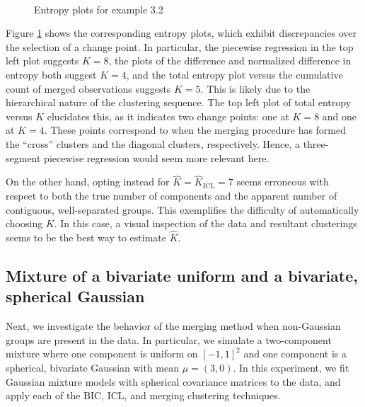 \documentclass{uwstat572}
\newcommand*\estim[1]{\widehat{#1}}
\renewcommand\;{\,}
\begin{document}
\begin{figure}
\begin{center}
\\
\end{center}
\caption{Entropy plots for example 3.2}
\label{Entropy2}
\end{figure}

Figure \ref{Entropy2} shows the corresponding entropy plots, which exhibit discrepancies over the selection of a change point.
In particular, the piecewise regression in the top left plot suggests $K = 8$, the plots of the difference and normalized difference in entropy both suggest $K = 4$, and the total entropy plot versus the cumulative count of merged observations suggests $K = 5$.
This is likely due to the hierarchical nature of the clustering sequence.
The top left plot of total entropy versus $K$ elucidates this, as it indicates two change points: one at $K = 8$ and one at $K = 4$.
These points correspond to when the merging procedure has formed the ``cross'' clusters and the diagonal clusters, respectively. 
Hence, a three-segment piecewise regression would seem more relevant here.

On the other hand, opting instead for $\estim K = \estim K_{\text{ICL}} = 7$ seems erroneous with respect to both the true number of components and the apparent number of contiguous, well-separated groups.
This exemplifies the difficulty of automatically choosing $K$.
In this case, a visual inspection of the data and resultant clusterings seems to be the best way to estimate $\estim K$.

\subsection{Mixture of a bivariate uniform and a bivariate, spherical Gaussian}
Next, we investigate the behavior of the merging method when non-Gaussian groups are present in the data.
In particular, we simulate a two-component mixture where one component is uniform on $[-1, 1]^2$ and one component is a spherical, bivariate Gaussian with mean $\mu = (3, 0)$.
In this experiment, we fit Gaussian mixture models with spherical covariance matrices to the data, and apply each of the BIC, ICL, and merging clustering techniques.
\end{document}
